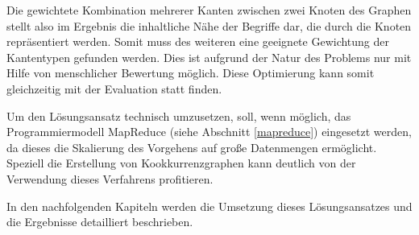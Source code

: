Die gewichtete Kombination mehrerer Kanten zwischen zwei Knoten des Graphen stellt also im Ergebnis die inhaltliche Nähe der Begriffe dar, die durch die Knoten repräsentiert werden. Somit muss des weiteren eine geeignete Gewichtung der Kantentypen gefunden werden. Dies ist aufgrund der Natur des Problems nur mit Hilfe von menschlicher Bewertung möglich. Diese Optimierung kann somit gleichzeitig mit der Evaluation statt finden.

Um den Lösungsansatz technisch umzusetzen, soll, wenn möglich, das Programmiermodell MapReduce \cite{dg2004}  (siehe Abschnitt \ref{mapreduce}) eingesetzt werden, da dieses die Skalierung des Vorgehens auf große Datenmengen ermöglicht. Speziell die Erstellung von Kookkurrenzgraphen kann deutlich von der Verwendung dieses Verfahrens profitieren.

In den nachfolgenden Kapiteln werden die Umsetzung dieses Lösungsansatzes und die Ergebnisse detailliert beschrieben.